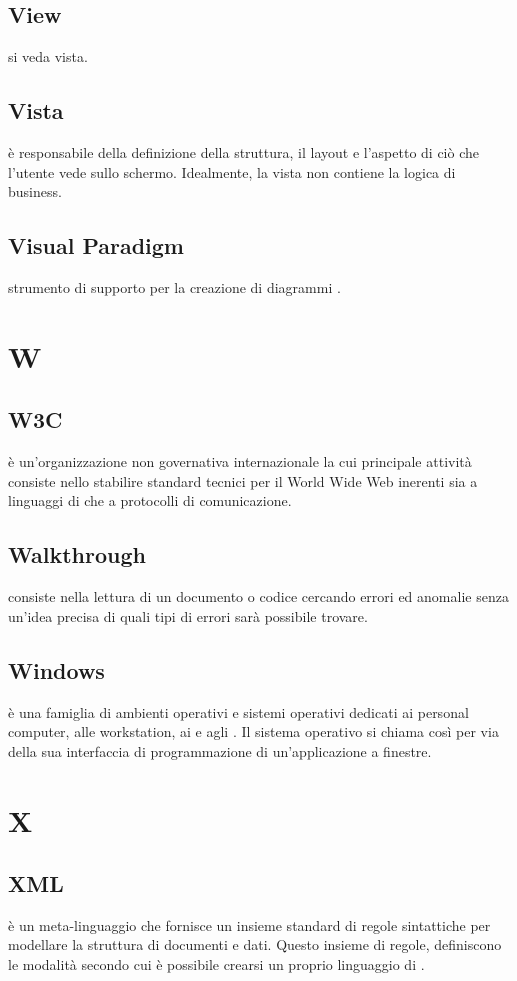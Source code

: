 \documentclass[12pt,a4paper]{article}
\begin{document}
\subsection{View} 
si veda vista.

\subsection{Vista} 
è responsabile della definizione della struttura, il layout e l'aspetto di ciò che l'utente vede sullo schermo. Idealmente, la vista non contiene la logica di business.

\subsection{Visual Paradigm} 
strumento di supporto per la creazione di diagrammi .


\newpage

\section{W}


\subsection{W3C} 
è un'organizzazione non governativa internazionale la cui principale attività  consiste nello stabilire standard tecnici per il World Wide Web inerenti sia a linguaggi di  che a protocolli di comunicazione.

\subsection{Walkthrough} 
consiste nella lettura di un documento o codice cercando errori ed anomalie senza un'idea precisa di quali tipi di errori sarà possibile trovare.

\subsection{Windows} 
è una famiglia di ambienti operativi e sistemi operativi dedicati ai personal computer, alle workstation, ai  e agli . Il sistema operativo si chiama così per via della sua interfaccia di programmazione di un'applicazione a finestre.


\newpage

\section{X}


\subsection{XML} 
è un meta-linguaggio che fornisce un insieme standard di regole sintattiche per modellare la struttura di documenti e dati. Questo insieme di regole, definiscono le modalità secondo cui è possibile crearsi un proprio linguaggio di  .
\end{document}
